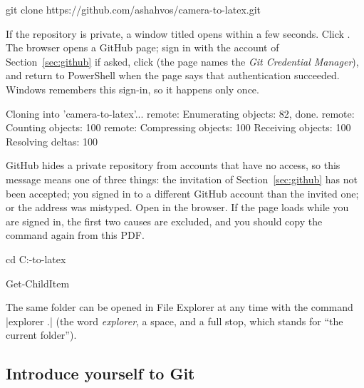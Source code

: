 \label{st:gitclone}
\begin{ps}
git clone https://github.com/ashahvos/camera-to-latex.git
\end{ps}
If the repository is private, a window titled  opens within a few
seconds. Click . The browser opens a GitHub page; sign in with
the account of Section~\ref{sec:github} if asked, click  (the page names the
\emph{Git Credential Manager}), and return to PowerShell when the page says that
authentication succeeded. Windows remembers this sign-in, so it happens only once.
\begin{out}
Cloning into 'camera-to-latex'...
remote: Enumerating objects: 82, done.
remote: Counting objects: 100%
remote: Compressing objects: 100%
Receiving objects: 100%
Resolving deltas: 100%
\end{out}

\begin{iffail}
GitHub hides a private repository from accounts that have no access, so this message means one
of three things: the invitation of Section~\ref{sec:github} has not been accepted; you signed in
to a different GitHub account than the invited one; or the address was mistyped. Open
\repourl{} in the browser. If the page loads while you
are signed in, the first two causes are excluded, and you should copy the command again from
this PDF.
\end{iffail}

\begin{ps}
cd C:\camera-to-latex
\end{ps}
\begin{ps}
Get-ChildItem
\end{ps}

The same folder can be opened in File Explorer at any time with the command
\code|explorer .| (the word \emph{explorer}, a space, and a full stop, which stands for ``the
current folder'').

\subsection{Introduce yourself to Git}

